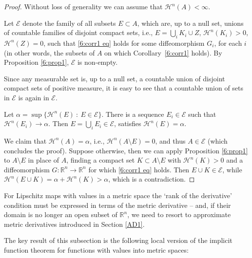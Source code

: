 \documentclass[12pt,leqno]{amsart}
\theoremstyle{definition}
\newcommand{\bbbr}{\mathbb R}
\def\H{{\mathcal H}}
\numberwithin{theorem}{section} \numberwithin{equation}{section}
\begin{document}
\begin{proof}
Without loss of generality we can assume that $\H^n(A)<\infty$.

Let $\mathcal{E}$ denote the family of all subsets $E\subset A$, which are, up to a null set,
unions of countable families
of disjoint compact sets, i.e., $E=\bigcup_i K_i\cup Z$, $\H^n(K_i)>0$, $\H^n(Z)=0$, such that \eqref{6:corr1 eq} holds for some diffeomorphism $G_i$, for each $i$ (in other words, the subsets of $A$ on which Corollary~\ref{6:corr1} holds). By Proposition \ref{6:prop1}, $\mathcal{E}$ is non-empty.

Since any measurable set is, up to a null set, a countable union of disjoint compact sets of positive measure, it is easy to see that a countable union of sets in $\mathcal{E}$ is again in $\mathcal{E}$.

Let  $\alpha=\sup\{\H^n(E)~:~E\in \mathcal{E}\}$. There is a sequence $E_i\in \mathcal{E}$ such that $\H^n(E_i)\to \alpha$. Then $E=\bigcup_i E_i\in\mathcal {E}$, satisfies $\H^n(E)=\alpha$.

We claim that $\H^n(A)=\alpha$, i.e., $\H^n(A\setminus E)=0$, and thus $A\in\mathcal{E}$ (which concludes the proof). Suppose otherwise, then we can apply Proposition \ref{6:prop1} to $A\setminus E$ in place of $A$, finding a compact set $K\subset A\setminus E$ with $\H^n(K)>0$ and a diffeomorphism $G:\bbbr^n\to\bbbr^n$ for which \eqref{6:corr1 eq} holds. Then $E\cup K\in \mathcal{E}$, while $\H^n(E\cup K)=\alpha+\H^n(K)>\alpha$, which is a contradiction.
\end{proof}


For Lipschitz maps with values in a metric space the `rank of the derivative' condition must be expressed in terms of the metric derivative -- and, if their domain is no longer an open subset of $\bbbr^n$, we need to resort to approximate metric derivatives introduced in Section \ref{AD1}.

The key result of this subsection is the following local version of the implicit function theorem for functions with values into metric spaces:
\end{document}
